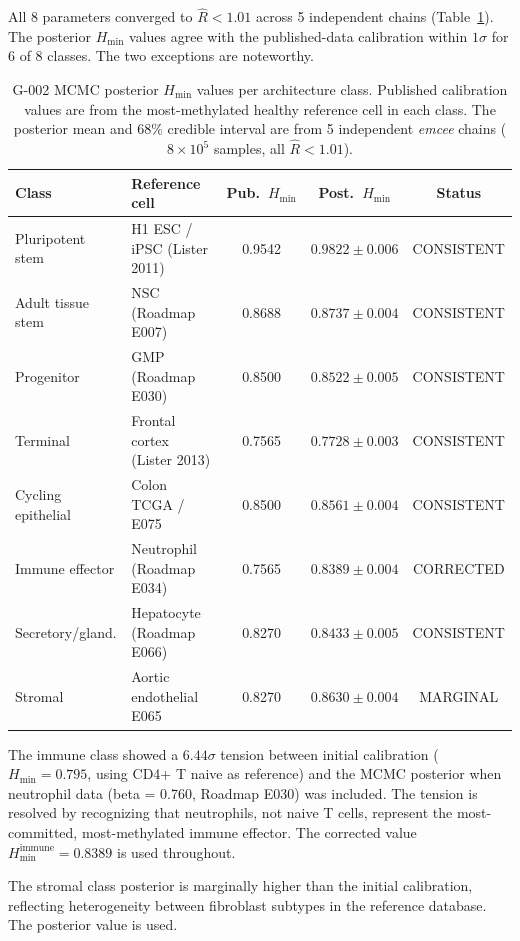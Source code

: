 \documentclass[12pt,a4paper]{article}
\newcommand{\Hmin}{H_{\min}}
\begin{document}
All 8 parameters converged to $\hat{R} < 1.01$ across 5 independent chains
(Table~\ref{tab:g002}). The posterior $\Hmin$ values agree with the published-data
calibration within $1\sigma$ for 6 of 8 classes. The two exceptions are
noteworthy.

\begin{table}[htb]
\centering
\caption{G-002 MCMC posterior $H_{\min}$ values per architecture class.
Published calibration values are from the most-methylated healthy reference
cell in each class. The posterior mean and 68\% credible interval are from
5 independent \textit{emcee} chains ($8 \times 10^5$ samples, all $\hat{R} < 1.01$).}
\label{tab:g002}
\begin{threeparttable}
\begin{tabular}{p{3.2cm}p{3.8cm}ccc}
\toprule
\textbf{Class} & \textbf{Reference cell} & \textbf{Pub.\ $\Hmin$} & \textbf{Post.\ $\Hmin$} & \textbf{Status} \\
\midrule
Pluripotent stem    & H1 ESC / iPSC (Lister 2011) & 0.9542 & $0.9822\pm0.006$ & CONSISTENT\\
Adult tissue stem   & NSC (Roadmap E007)          & 0.8688 & $0.8737\pm0.004$ & CONSISTENT\\
Progenitor          & GMP (Roadmap E030)          & 0.8500 & $0.8522\pm0.005$ & CONSISTENT\\
Terminal            & Frontal cortex (Lister 2013)& 0.7565 & $0.7728\pm0.003$ & CONSISTENT\\
Cycling epithelial  & Colon TCGA / E075           & 0.8500 & $0.8561\pm0.004$ & CONSISTENT\\
Immune effector     & Neutrophil (Roadmap E034)   & 0.7565 & $0.8389\pm0.004$ & CORRECTED\tnote{a}\\
Secretory/gland.    & Hepatocyte (Roadmap E066)   & 0.8270 & $0.8433\pm0.005$ & CONSISTENT\\
Stromal             & Aortic endothelial E065     & 0.8270 & $0.8630\pm0.004$ & MARGINAL\tnote{b}\\
\bottomrule
\end{tabular}
\begin{tablenotes}
\small
\item[a] The immune class showed a $6.44\sigma$ tension between initial calibration
($H_{\min} = 0.795$, using CD4+ T naive as reference) and the MCMC posterior
when neutrophil data (beta = 0.760, Roadmap E030) was included. The tension
is resolved by recognizing that neutrophils, not naive T cells, represent the
most-committed, most-methylated immune effector. The corrected value
$H_{\min}^{\mathrm{immune}} = 0.8389$ is used throughout.
\item[b] The stromal class posterior is marginally higher than the initial
calibration, reflecting heterogeneity between fibroblast subtypes in the
reference database. The posterior value is used.
\end{tablenotes}
\end{threeparttable}
\end{table}
\end{document}
